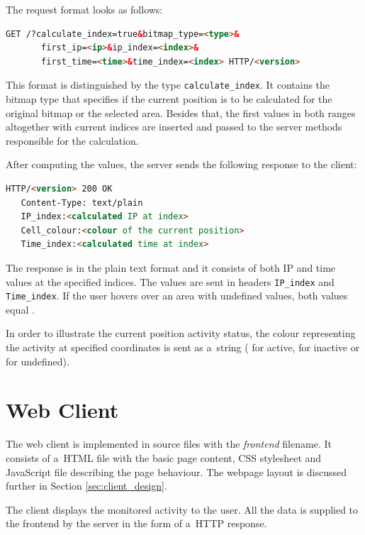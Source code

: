 The request format looks as follows:

\begin{lstlisting}[language=HTML,label={lst:current_position}]
   GET /?calculate_index=true&bitmap_type=<type>&
       first_ip=<ip>&ip_index=<index>&
       first_time=<time>&time_index=<index> HTTP/<version>
\end{lstlisting}

This format is distinguished by the type \texttt{calculate\_index}. It contains
the bitmap type that specifies if the current position is to be calculated for
the original bitmap or the selected area. Besides that, the first values in
both ranges altogether with current indices are inserted and passed to the
server methods responsible for the calculation. 

After computing the values, the server sends the following response to the client:

\begin{lstlisting}[language=HTML,label={lst:current_position_resp}]
   HTTP/<version> 200 OK
   Content-Type: text/plain
   IP_index:<calculated IP at index>
   Cell_colour:<colour of the current position>
   Time_index:<calculated time at index>
\end{lstlisting}

The response is in the plain text format and it consists of both
IP and time values at the specified indices. The values are sent in
headers \texttt{IP\_index} and \texttt{Time\_index}. If the user hovers
over an area with undefined values, both values equal \texttt{}.

In order to illustrate the current position activity
status, the colour representing the activity at specified coordinates is sent
as a~string ( for active,  for inactive or
 for undefined). 



\section{Web Client}
The web client is implemented in source files with the \textit{frontend} filename. It
consists of a~HTML file with the basic page content, CSS stylesheet and JavaScript
file describing the page behaviour. The webpage layout is discussed further in Section
\ref{sec:client_design}.

The client displays the monitored activity to the user. All the data is supplied
to the frontend by the server in the form of a~HTTP response.

